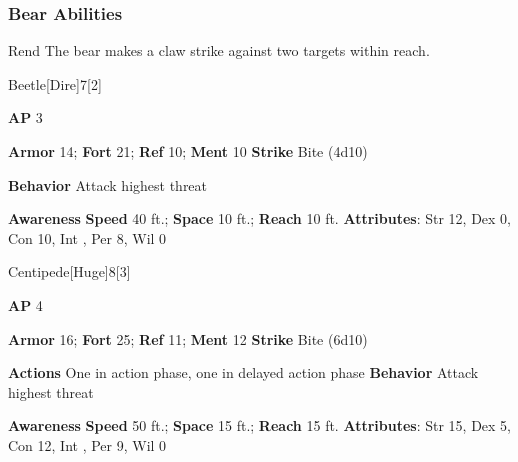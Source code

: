 \subsubsection{Bear Abilities}

\begin{freeability}{Rend}
The bear makes a claw strike against two targets within reach.
\end{freeability}

\begin{monsection}{Beetle}[Dire]{7}[2]
\vspace{-1em}\vspace{-1em}
\begin{spellcontent}
\begin{spelltargetinginfo}
{\textbf{AP} 3}

\pari \textbf{Armor} 14;
\textbf{Fort} 21;
\textbf{Ref} 10;
\textbf{Ment} 10
\pari \textbf{Strike} Bite  (4d10)



\pari \textbf{Behavior} Attack highest threat
\end{spelltargetinginfo}
\end{spellcontent}

\begin{monsterfooter}
\pari \textbf{Awareness} 
\pari \textbf{Speed} 40 ft.;
\textbf{Space} 10 ft.;
\textbf{Reach} 10 ft.
\pari \textbf{Attributes}:
Str 12,
Dex 0,
Con 10,
Int ,
Per 8,
Wil 0
\end{monsterfooter}
\end{monsection}

\begin{monsection}{Centipede}[Huge]{8}[3]
\vspace{-1em}\vspace{-1em}
\begin{spellcontent}
\begin{spelltargetinginfo}
{\textbf{AP} 4}

\pari \textbf{Armor} 16;
\textbf{Fort} 25;
\textbf{Ref} 11;
\textbf{Ment} 12
\pari \textbf{Strike} Bite  (6d10)


\pari \textbf{Actions} One in action phase, one in delayed action phase
\pari \textbf{Behavior} Attack highest threat
\end{spelltargetinginfo}
\end{spellcontent}

\begin{monsterfooter}
\pari \textbf{Awareness} 
\pari \textbf{Speed} 50 ft.;
\textbf{Space} 15 ft.;
\textbf{Reach} 15 ft.
\pari \textbf{Attributes}:
Str 15,
Dex 5,
Con 12,
Int ,
Per 9,
Wil 0
\end{monsterfooter}
\end{monsection}

